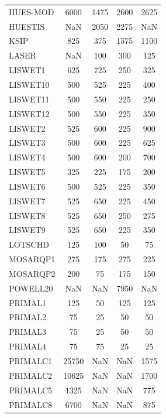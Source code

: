 \begin{longtable}{lcccc}
HUES-MOD &     6000 &  1475 &     2600 &     2625 \\
HUESTIS  &      NaN &  2050 &     2275 &      NaN \\
KSIP     &      825 &   375 &     1575 &     1100 \\
LASER    &      NaN &   100 &      300 &      125 \\
LISWET1  &      625 &   725 &      250 &      325 \\
LISWET10 &      500 &   525 &      225 &      400 \\
LISWET11 &      500 &   550 &      225 &      250 \\
LISWET12 &      500 &   550 &      225 &      350 \\
LISWET2  &      525 &   600 &      225 &      900 \\
LISWET3  &      500 &   600 &      225 &      625 \\
LISWET4  &      500 &   600 &      200 &      700 \\
LISWET5  &      325 &   225 &      175 &      200 \\
LISWET6  &      500 &   525 &      225 &      350 \\
LISWET7  &      525 &   650 &      225 &      450 \\
LISWET8  &      525 &   650 &      250 &      275 \\
LISWET9  &      525 &   650 &      225 &      350 \\
LOTSCHD  &      125 &   100 &       50 &       75 \\
MOSARQP1 &      275 &   175 &      275 &      225 \\
MOSARQP2 &      200 &    75 &      175 &      150 \\
POWELL20 &      NaN &   NaN &     7950 &      NaN \\
PRIMAL1  &      125 &    50 &      125 &      125 \\
PRIMAL2  &       75 &    25 &       50 &       50 \\
PRIMAL3  &       75 &    25 &       50 &       50 \\
PRIMAL4  &       75 &    75 &       25 &       25 \\
PRIMALC1 &    25750 &   NaN &      NaN &     1575 \\
PRIMALC2 &    10625 &   NaN &      NaN &     1700 \\
PRIMALC5 &     1325 &   NaN &      NaN &      775 \\
PRIMALC8 &     6700 &   NaN &      NaN &      875 \\

\end{longtable}
